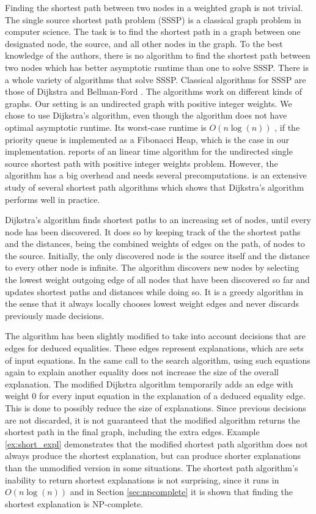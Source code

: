 Finding the shortest path between two nodes in a weighted graph is not trivial.
The single source shortest path problem (SSSP) is a classical graph problem in computer science.
The task is to find the shortest path in a graph between one designated node, the source, and all other nodes in the graph.
To the best knowledge of the authors, there is no algorithm to find the shortest path between two nodes which has better asymptotic runtime than one to solve SSSP.
There is a whole variety of algorithms that solve SSSP.
Classical algorithms for SSSP are those of Dijkstra \cite{Dijkstra1959} and Bellman-Ford \cite{Ford1956,Bellman1956}.
The algorithms work on different kinds of graphs.
Our setting is an undirected graph with positive integer weights.
We chose to use Dijkstra's algorithm, even though the algorithm does not have optimal asymptotic runtime.
Its worst-case runtime is $O(n \log(n))$ \cite{Cormen1989}, if the priority queue is implemented as a Fibonacci Heap, which is the case in our implementation.
\cite{Thorup1999} reports of an linear time algorithm for the undirected single source shortest path with positive integer weights problem.
However, the algorithm has a big overhead and needs several precomputations.
\cite{Cherkassky1996} is an extensive study of several shortest path algorithms which shows that Dijkstra's algorithm performs well in practice.

Dijkstra's algorithm finds shortest paths to an increasing set of nodes, until every node has been discovered.
It does so by keeping track of the the shortest paths and the distances, being the combined weights of edges on the path, of nodes to the source.
Initially, the only discovered node is the source itself and the distance to every other node is infinite.
The algorithm discovers new nodes by selecting the lowest weight outgoing edge of all nodes that have been discovered so far and updates shortest paths and distances while doing so.
It is a greedy algorithm in the sense that it always locally chooses lowest weight edges and never discards previously made decisions.

The algorithm has been slightly modified to take into account decisions that are edges for deduced equalities.
These edges represent explanations, which are sets of input equations.
In the same call to the search algorithm, using such equations again to explain another equality does not increase the size of the overall explanation.
The modified Dijkstra algorithm temporarily adds an edge with weight 0 for every input equation in the explanation of a deduced equality edge.
This is done to possibly reduce the size of explanations.
Since previous decisions are not discarded, it is not guaranteed that the modified algorithm returns the shortest path in the final graph, including the extra edges.
Example \ref{ex:short_expl} demonstrates that the modified shortest path algorithm does not always produce the shortest explanation, but can produce shorter explanations than the unmodified version in some situations.
The shortest path algorithm's inability to return shortest explanations is not surprising, since it runs in $O(n \log(n))$ and in Section \ref{sec:npcomplete} it is shown that finding the shortest explanation is NP-complete.

